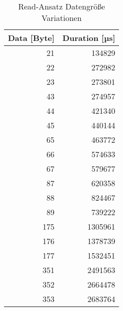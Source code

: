 \begin{table}
\centering
\caption{Read-Ansatz Datengröße Variationen}
\label{table:readdetailData [Byte]change}
\begin{tabular}{rr}
\toprule
 Data [Byte] &  Duration [µs] \\
\midrule
        21 &    134829 \\
        22 &    272982 \\
        23 &    273801 \\
        43 &    274957 \\
        44 &    421340 \\
        45 &    440144 \\
        65 &    463772 \\
        66 &    574633 \\
        67 &    579677 \\
        87 &    620358 \\
        88 &    824467 \\
        89 &    739222 \\
       175 &   1305961 \\
       176 &   1378739 \\
       177 &   1532451 \\
       351 &   2491563 \\
       352 &   2664478 \\
       353 &   2683764 \\
\bottomrule
\end{tabular}
\end{table}
